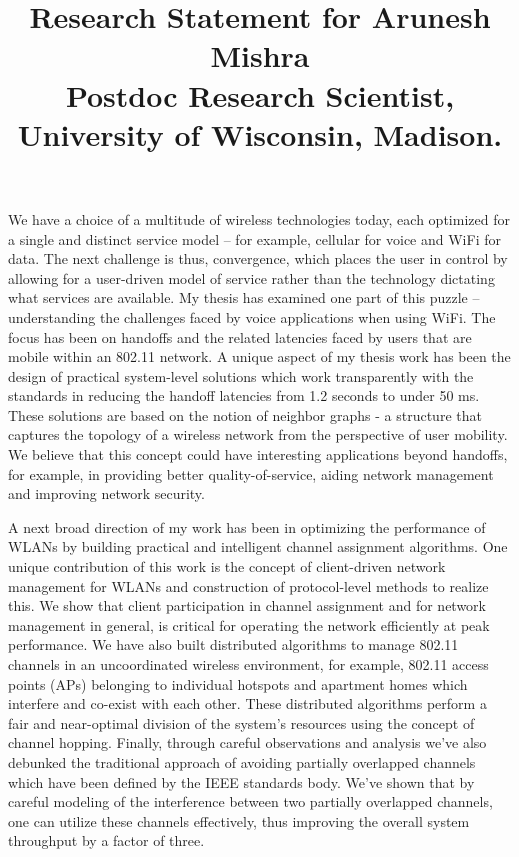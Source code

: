 \documentclass[10pt,letterpaper]{article}
\title{
\vspace{-2cm}Research Statement for Arunesh Mishra\\
{\large Postdoc Research Scientist, University of Wisconsin, Madison.}}
\begin{document}
\date{}
\maketitle
\vspace{-1cm}
We have a choice of a multitude of wireless technologies today, each optimized for a single and distinct service model -- for example, cellular for
voice and WiFi for data. The next challenge is thus, convergence, which places the user in control  by 
allowing for a user-driven model of service rather than the technology dictating what services are available. My thesis has examined one part of this puzzle --
understanding the challenges faced by voice applications when using WiFi. The focus has been on handoffs and the related
latencies faced by users that are mobile within an 802.11 network. A unique aspect of my thesis work has been the design of
practical system-level solutions which work transparently with the standards in reducing the handoff latencies from 1.2
seconds to under 50 ms. These solutions are based on the notion of neighbor graphs - a
structure that captures the topology of a wireless network from the perspective of user mobility. We believe that this
concept could have interesting applications beyond handoffs, for example, in providing better quality-of-service, aiding
network management and improving network security. 

 A next broad direction of my work has been in optimizing the performance of WLANs by building practical and
intelligent channel assignment algorithms. One unique contribution of this work is the concept of client-driven network
management for WLANs and construction of protocol-level methods to realize this. We show that client participation in
channel assignment and for network management in general, is critical for operating the network efficiently at peak
performance. We have also built distributed algorithms to manage 802.11 channels in an uncoordinated wireless
environment, for example, 802.11 access points (APs) belonging to individual hotspots and apartment homes  which interfere and co-exist with
each other. These distributed algorithms perform a fair and near-optimal division of the system's resources using the concept of
channel hopping.  Finally, through careful observations and analysis we've also debunked the traditional approach of
avoiding partially overlapped channels which have been defined by the IEEE standards body.  We've shown that by careful modeling of the interference between two partially
overlapped channels, one can utilize these channels effectively, thus improving the overall system throughput by a
factor of three.
\end{document}
